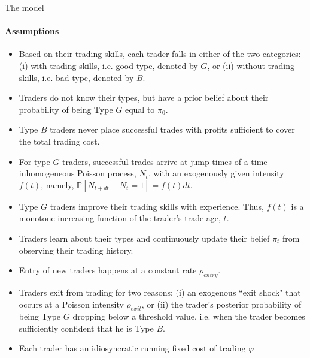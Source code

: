 \documentclass{beamer}
\begin{document}
\begin{frame}[allowframebreaks]{The model}
\framesubtitle{Assumptions}

\begin{itemize}

	\item Based on their trading skills, each trader falls in either of the two categories: (i) with trading skills, i.e. good type, denoted by $G$, or (ii) without trading skills, i.e. bad type, denoted by $B$.

	\item Traders do not know their types, but have a prior belief about their probability of being Type $G$ equal to $\pi_0$.

	\item Type $B$ traders never place successful trades with profits sufficient to cover the total trading cost.

	\item For type $G$ traders, successful trades arrive at jump times of a time-inhomogeneous Poisson process, $N_t$, with an exogenously given intensity $f(t)$, namely, $\mathbb P[N_{t+dt}-N_t = 1] = f(t)dt$.

	\item Type $G$ traders improve their trading skills with experience. Thus, $f(t)$ is a monotone increasing function of the trader's trade age, $t$.

	\item Traders learn about their types and continuously update their belief $\pi_t$ from observing their trading history.

	\item Entry of new traders happens at a constant rate $\rho_{entry}$.

	\item Traders exit from trading for two reasons: (i) an exogenous ``exit shock" that occurs at a Poisson intensity $\rho_{exit}$, or (ii) the trader's posterior probability of being Type $G$ dropping below a threshold value, i.e. when the trader becomes sufficiently confident that he is Type $B$.

	\item Each trader has an idiosyncratic running fixed cost of trading $\varphi$
\end{itemize}
\end{frame}
\end{document}
